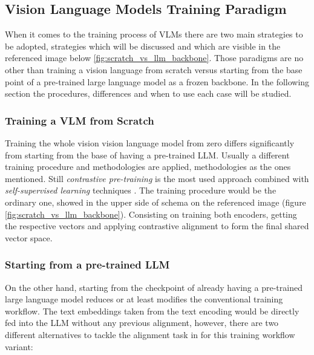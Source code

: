 \subsection{Vision Language Models Training Paradigm}
When it comes to the training process of VLMs there are two main strategies to be adopted, strategies which will be discussed and which are visible in the referenced image below \ref{fig:scratch_vs_llm_backbone}. Those paradigms are no other than training a vision language from scratch versus starting from the base point of a pre-trained large language model as a frozen backbone. In the following section the procedures, differences and when to use each case will be studied.

\subsubsection{Training a VLM from Scratch}
Training the whole vision vision language model from zero differs significantly from starting from the base of having a pre-trained LLM. Usually a different training procedure and methodologies are applied, methodologies as the ones mentioned. Still \textit{contrastive pre-training} is the most used approach combined with \textit{self-supervised learning} techniques \cite{li2025surveystateartlarge}. The training procedure would be the ordinary one, showed in the upper side of schema on the referenced image (figure \ref{fig:scratch_vs_llm_backbone}). Consisting on training both encoders, getting the respective vectors and applying contrastive alignment to form the final shared vector space. 

\subsubsection{Starting from a pre-trained LLM}
On the other hand, starting from the checkpoint of already having a pre-trained large language model reduces or at least modifies the conventional training workflow. The text embeddings taken from the text encoding would be directly fed into the LLM without any previous alignment, however, there are two different alternatives to tackle the alignment task in for this training workflow variant: 

